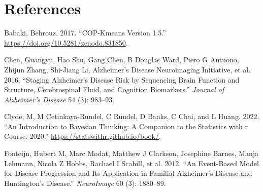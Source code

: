 \documentclass[
  letterpaper,
  DIV=11,
  numbers=noendperiod]{scrreprt}
\newlength{\cslhangindent}
\newenvironment{CSLReferences}[2] %
 {\begin{list}{}{%
  \setlength{\itemindent}{0pt}
  \setlength{\leftmargin}{0pt}
  \setlength{\parsep}{0pt}
  \ifodd #1
   \setlength{\leftmargin}{\cslhangindent}
   \setlength{\itemindent}{-1\cslhangindent}
  \fi
  \setlength{\itemsep}{#2\baselineskip}}}
 {\end{list}}
\begin{document}

\chapter*{References}\label{references}


\label{refs}
\begin{CSLReferences}{1}{0}
Babaki, Behrouz. 2017. {``COP-Kmeans Version 1.5.''}
\url{https://doi.org/10.5281/zenodo.831850}.

Chen, Guangyu, Hao Shu, Gang Chen, B Douglas Ward, Piero G Antuono,
Zhijun Zhang, Shi-Jiang Li, Alzheimer's Disease Neuroimaging Initiative,
et al. 2016. {``Staging Alzheimer's Disease Risk by Sequencing Brain
Function and Structure, Cerebrospinal Fluid, and Cognition
Biomarkers.''} \emph{Journal of Alzheimer's Disease} 54 (3): 983--93.

Clyde, M, M Cetinkaya-Rundel, C Rundel, D Banks, C Chai, and L Huang.
2022. {``An Introduction to Bayesian Thinking: A Companion to the
Statistics with r Course. 2020.''}
\url{https://statswithr.github.io/book/}.

Fonteijn, Hubert M, Marc Modat, Matthew J Clarkson, Josephine Barnes,
Manja Lehmann, Nicola Z Hobbs, Rachael I Scahill, et al. 2012. {``An
Event-Based Model for Disease Progression and Its Application in
Familial Alzheimer's Disease and Huntington's Disease.''}
\emph{NeuroImage} 60 (3): 1880--89.

\end{CSLReferences}
\end{document}

